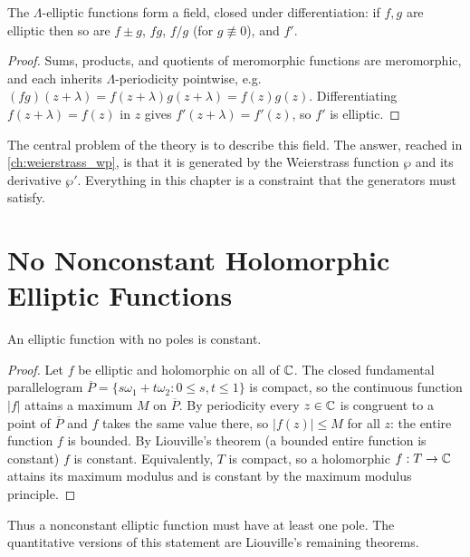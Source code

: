\begin{proposition}
\label{prop:ell-field}
The \(\Lambda\)-elliptic functions form a field, closed under differentiation:
if \(f, g\) are elliptic then so are \(f \pm g\), \(fg\), \(f/g\) (for
\(g \not\equiv 0\)), and \(f'\).
\end{proposition}

\begin{proof}
Sums, products, and quotients of meromorphic functions are meromorphic, and each
inherits \(\Lambda\)-periodicity pointwise, e.g.\ \((fg)(z+\lambda) =
f(z+\lambda)g(z+\lambda) = f(z)g(z)\). Differentiating \(f(z+\lambda)=f(z)\) in
\(z\) gives \(f'(z+\lambda) = f'(z)\), so \(f'\) is elliptic.
\end{proof}

The central problem of the theory is to describe this field. The answer,
reached in \cref{ch:weierstrass_wp}, is that it is generated by the Weierstrass
function \(\wp\) and its derivative \(\wp'\). Everything in this chapter is a
constraint that the generators must satisfy.

\section{No Nonconstant Holomorphic Elliptic Functions}
\label{sec:ell-liouville-const}

\begin{theorem}
\label{thm:ell-const}
An elliptic function with no poles is constant.
\end{theorem}

\begin{proof}
Let \(f\) be elliptic and holomorphic on all of \(\mathbb{C}\). The closed fundamental
parallelogram
\(\overline{P} = \{ s\omega_1 + t\omega_2 : 0 \le s, t \le 1 \}\) is compact, so
the continuous function \(|f|\) attains a maximum \(M\) on \(\overline{P}\). By
periodicity every \(z \in \mathbb{C}\) is congruent to a point of \(\overline P\) and
\(f\) takes the same value there, so \(|f(z)| \le M\) for all \(z\): the entire
function \(f\) is bounded. By Liouville's theorem (a bounded entire function is
constant) \(f\) is constant. Equivalently, \(T\) is compact, so a holomorphic
\(f : T \to \mathbb{C}\) attains its maximum modulus and is constant by the maximum
modulus principle.
\end{proof}

Thus a nonconstant elliptic function must have at least one pole. The
quantitative versions of this statement are Liouville's remaining theorems.

